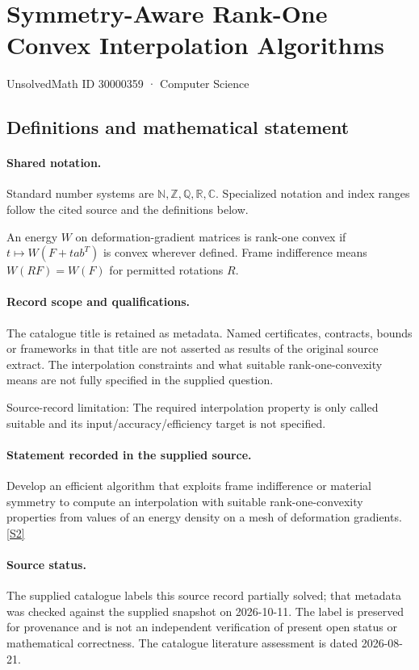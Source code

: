 \documentclass[11pt]{article}
\newcommand{\sref}[2]{\hyperlink{source:#1:#2}{[S#2]}}
\begin{document}
\setcounter{section}{30000358}
\section{Symmetry-Aware Rank-One Convex Interpolation Algorithms}\label{30000359}
{\small\sffamily UnsolvedMath ID 30000359 · Computer Science}
\subsection{Definitions and mathematical statement}

\paragraph{Shared notation.}Standard number systems are $\mathbb N,\mathbb Z,\mathbb Q,\mathbb R,\mathbb C$. Specialized notation and index ranges follow the cited source and the definitions below.


An energy $W$ on deformation-gradient matrices is rank-one convex if $t\mapsto W(F+t ab^T)$ is convex wherever defined. Frame indifference means $W(RF)=W(F)$ for permitted rotations $R$.
\paragraph{Record scope and qualifications.}
The catalogue title is retained as metadata. Named certificates, contracts, bounds or frameworks in that title are not asserted as results of the original source extract.
The interpolation constraints and what suitable rank-one-convexity means are not fully specified in the supplied question.

Source-record limitation: The required interpolation property is only called suitable and its input/accuracy/efficiency target is not specified.
\paragraph{Statement recorded in the supplied source.}
Develop an efficient algorithm that exploits frame indifference or material symmetry to compute an interpolation with suitable rank-one-convexity properties from values of an energy density on a mesh of deformation gradients. \sref{30000359}{2}
\paragraph{Source status.}
The supplied catalogue labels this source record partially solved; that metadata was checked against the supplied snapshot on 2026-10-11. The label is preserved for provenance and is not an independent verification of present open status or mathematical correctness. The catalogue literature assessment is dated 2026-08-21.
\end{document}
